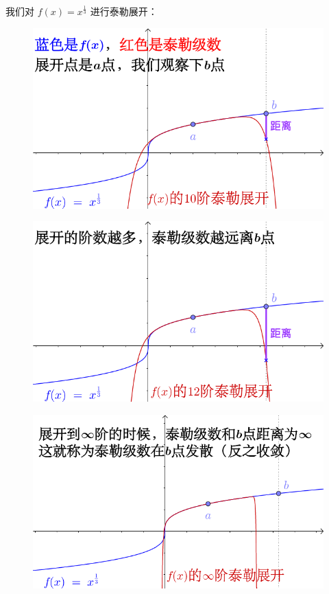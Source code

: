 \documentclass[12pt]{article}
\begin{document}
我们对 $f(x) = x^{\frac{1}{3}}$ 进行泰勒展开：
\begin{figure}[H]
  \centering
  \includegraphics[width=.8\textwidth]{fig/TaylorExpansion_1.png} 
\end{figure}
\begin{figure}[H]
  \centering
  \includegraphics[width=.8\textwidth]{fig/TaylorExpansion_2.png} 
\end{figure}
\begin{figure}[H]
  \centering
  \includegraphics[width=.8\textwidth]{fig/TaylorExpansion_3.png} 
\end{figure}
\end{document}
